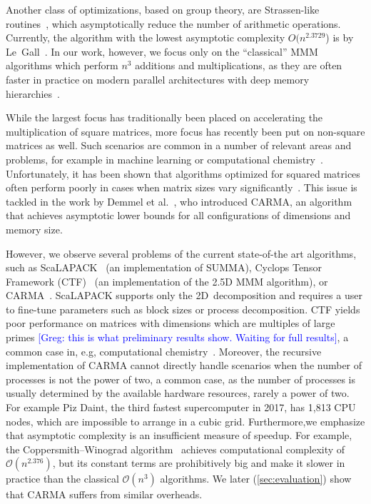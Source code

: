 \documentclass[sigplan,review,anonymous]{acmart}\settopmatter{printfolios=true,printccs=false,printacmref=false}
\newcommand\greg[1]{\textcolor{blue}{[Greg: #1]}}
\newcommand\mac[1]{\textcolor{red}{[Mac: #1]}}
\begin{document}
Another class of optimizations, based on group theory,
are Strassen-like routines~\cite{Strassen}, which asymptotically reduce the
number of arithmetic operations. Currently, the algorithm with the lowest
asymptotic complexity $O(n^{2.3729}$) is by Le~Gall~\cite{LeGall}. In our work,
however, we focus only on the ``classical'' MMM algorithms which perform $n^3$
additions and multiplications, as they are often faster in practice on modern 
parallel architectures with deep memory hierarchies~\cite{strassenVsClassic}.  

While the largest focus has traditionally been
placed on accelerating the multiplication of square matrices, more focus has
recently been put on
non-square matrices as well. Such scenarios are common in a number of
relevant areas and problems, for example in machine learning
\cite{rectangularML} or computational chemistry~\cite{rectangularChemistry}.
%
Unfortunately, it has been shown
that algorithms optimized for squared matrices often perform poorly in cases
when matrix sizes vary significantly~\cite{CARMA}. 
%
This issue is tackled in the work by Demmel et al.~\cite{CARMA}, who introduced
CARMA, an algorithm that achieves asymptotic lower bounds for all
configurations of dimensions and memory size.  


%

However, we observe several problems of the current state-of-the art
algorithms, such as ScaLAPACK~\cite{scalapack} (an implementation of
SUMMA), Cyclops Tensor Framework (CTF)~\cite{cyclops} (an implementation of the 
2.5D MMM algorithm), or CARMA~\cite{CARMA}. ScaLAPACK supports
only the 2D~decomposition  and requires a user to
fine-tune parameters such as block sizes or process
decomposition. CTF yields poor performance on matrices with 
dimensions which are multiples of large primes
\greg{this is what preliminary results show. Waiting for full results}, a 
common case in, e.g,
computational chemistry~\cite{joost}. Moreover, the recursive
implementation of CARMA cannot directly handle scenarios when the number of
processes is not the power of two, a common
case, as the number of processes is usually determined by the available
hardware resources, rarely a power of two.  For example Piz Daint, the
third fastest supercomputer in 2017, has 1,813 CPU nodes, which are
impossible to arrange in a cubic grid. Furthermore,we emphasize that asymptotic 
complexity is an insufficient measure of speedup. For example, the
Coppersmith--Winograd algorithm~\cite{coppersmith} achieves computational
complexity of $\mathcal{O}(n^{2.376})$, but its constant terms are 
prohibitively big and
make it slower in practice than the classical $\mathcal{O}(n^{3})$ algorithms. 
We later (\cref{sec:evaluation}) show that CARMA suffers from similar
overheads.
\end{document}
